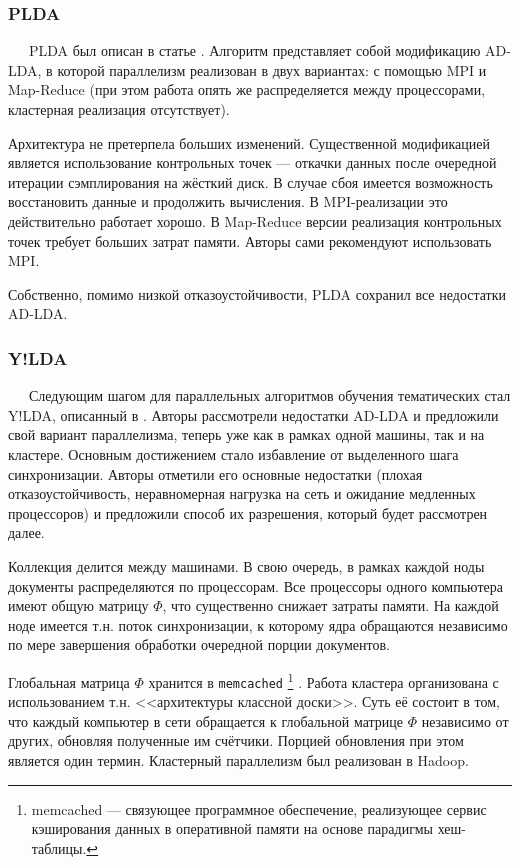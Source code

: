 \subsubsection{PLDA}
$\quad\;\:$PLDA был описан в статье \cite{plda}. Алгоритм представляет собой модификацию AD-LDA, в которой параллелизм реализован в двух вариантах: с помощью MPI и Map-Reduce (при этом работа опять же распределяется между процессорами, кластерная реализация отсутствует). 

Архитектура не претерпела больших изменений. Существенной модификацией является использование контрольных точек --- откачки данных после очередной итерации сэмплирования на жёсткий диск. В случае сбоя имеется возможность восстановить данные и продолжить вычисления. В MPI-реализации это действительно работает хорошо. В Map-Reduce версии реализация контрольных точек требует больших затрат памяти. Авторы сами рекомендуют использовать MPI.

Собственно, помимо низкой отказоустойчивости, PLDA сохранил все недостатки AD-LDA.

\subsubsection{Y!LDA}
$\quad\;\:$Следующим шагом для параллельных алгоритмов обучения тематических стал Y!LDA, описанный в \cite{y_lda}. Авторы рассмотрели недостатки AD-LDA и предложили свой вариант параллелизма, теперь уже как в рамках одной машины, так и на кластере. Основным достижением стало избавление от выделенного шага синхронизации. Авторы отметили его основные недостатки (плохая отказоустойчивость, неравномерная нагрузка на сеть и ожидание медленных процессоров) 
и предложили способ их разрешения, который будет рассмотрен далее.

Коллекция делится между машинами. В свою очередь, в рамках каждой ноды документы распределяются по процессорам. Все процессоры одного компьютера имеют общую матрицу $\Phi$, что существенно снижает затраты памяти. На каждой ноде имеется т.н. поток синхронизации, к которому ядра обращаются независимо по мере завершения обработки очередной порции документов.

Глобальная матрица $\Phi$ хранится в \verb|memcached|
\footnote{memcached — связующее программное обеспечение, реализующее сервис кэширования данных в оперативной памяти на основе парадигмы хеш-таблицы.}
.
Работа кластера организована с использованием т.н. <<архитектуры классной доски>>. Суть её состоит в том, что каждый компьютер в сети обращается к глобальной матрице $\Phi$ независимо от других, обновляя полученные им счётчики. Порцией обновления при этом является один термин. Кластерный параллелизм был реализован в Hadoop.

